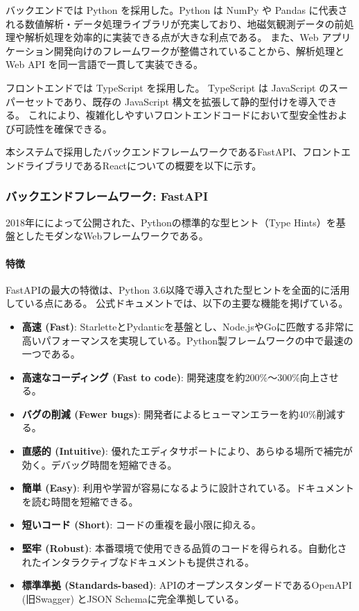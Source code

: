 バックエンドでは Python を採用した。Python は NumPy や Pandas に代表される数値解析・データ処理ライブラリが充実しており、地磁気観測データの前処理や解析処理を効率的に実装できる点が大きな利点である。
また、Web アプリケーション開発向けのフレームワークが整備されていることから、解析処理と Web API を同一言語で一貫して実装できる。

フロントエンドでは TypeScript を採用した。
TypeScript は JavaScript のスーパーセットであり、既存の JavaScript 構文を拡張して静的型付けを導入できる。
これにより、複雑化しやすいフロントエンドコードにおいて型安全性および可読性を確保できる。

本システムで採用したバックエンドフレームワークであるFastAPI、フロントエンドライブラリであるReactについての概要を以下に示す。

\subsubsection{バックエンドフレームワーク: FastAPI}

2018年に\cite{FastAPI}によって公開された、Pythonの標準的な型ヒント（Type Hints）を基盤としたモダンなWebフレームワークである。

\paragraph{特徴}

FastAPIの最大の特徴は、Python 3.6以降で導入された型ヒントを全面的に活用している点にある。
公式ドキュメントでは、以下の主要な機能を掲げている。

\begin{itemize}
    \item \textbf{高速 (Fast)}: StarletteとPydanticを基盤とし、Node.jsやGoに匹敵する非常に高いパフォーマンスを実現している。Python製フレームワークの中で最速の一つである。
    \item \textbf{高速なコーディング (Fast to code)}: 開発速度を約200\%〜300\%向上させる。
    \item \textbf{バグの削減 (Fewer bugs)}: 開発者によるヒューマンエラーを約40\%削減する。
    \item \textbf{直感的 (Intuitive)}: 優れたエディタサポートにより、あらゆる場所で補完が効く。デバッグ時間を短縮できる。
    \item \textbf{簡単 (Easy)}: 利用や学習が容易になるように設計されている。ドキュメントを読む時間を短縮できる。
    \item \textbf{短いコード (Short)}: コードの重複を最小限に抑える。
    \item \textbf{堅牢 (Robust)}: 本番環境で使用できる品質のコードを得られる。自動化されたインタラクティブなドキュメントも提供される。
    \item \textbf{標準準拠 (Standards-based)}: APIのオープンスタンダードであるOpenAPI (旧Swagger) とJSON Schemaに完全準拠している。
\end{itemize}

